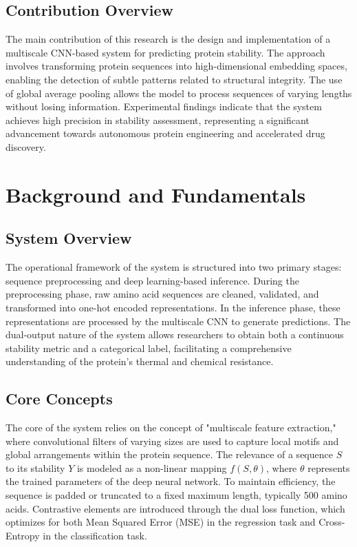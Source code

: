 \documentclass[conference]{IEEEtran}
\begin{document}
\subsection{Contribution Overview}
The main contribution of this research is the design and implementation of a multiscale CNN-based system for predicting protein stability. The approach involves transforming protein sequences into high-dimensional embedding spaces, enabling the detection of subtle patterns related to structural integrity. The use of global average pooling allows the model to process sequences of varying lengths without losing information. Experimental findings indicate that the system achieves high precision in stability assessment, representing a significant advancement towards autonomous protein engineering and accelerated drug discovery.

\section{Background and Fundamentals}
\subsection{System Overview}
The operational framework of the system is structured into two primary stages: sequence preprocessing and deep learning-based inference. During the preprocessing phase, raw amino acid sequences are cleaned, validated, and transformed into one-hot encoded representations. In the inference phase, these representations are processed by the multiscale CNN to generate predictions. The dual-output nature of the system allows researchers to obtain both a continuous stability metric and a categorical label, facilitating a comprehensive understanding of the protein's thermal and chemical resistance.

\subsection{Core Concepts}
The core of the system relies on the concept of "multiscale feature extraction," where convolutional filters of varying sizes are used to capture local motifs and global arrangements within the protein sequence. The relevance of a sequence $S$ to its stability $Y$ is modeled as a non-linear mapping $f(S, \theta)$, where $\theta$ represents the trained parameters of the deep neural network. To maintain efficiency, the sequence is padded or truncated to a fixed maximum length, typically 500 amino acids. Contrastive elements are introduced through the dual loss function, which optimizes for both Mean Squared Error (MSE) in the regression task and Cross-Entropy in the classification task.
\end{document}
